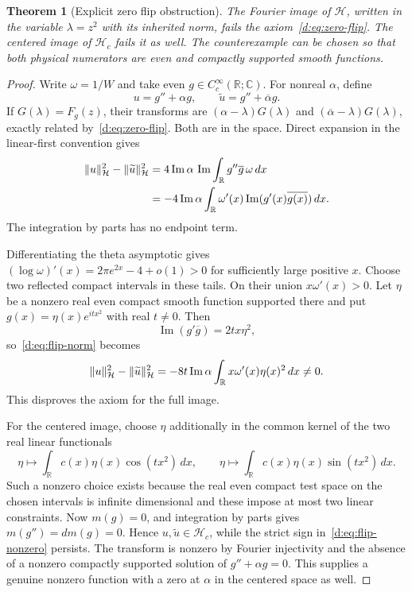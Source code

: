 \documentclass[11pt,a4paper]{article}
\numberwithin{equation}{section}
\newtheorem{theorem}{Theorem}[section]
\theoremstyle{definition}\newtheorem{definition}[theorem]{Definition}
\theoremstyle{remark}\newtheorem{remark}[theorem]{Remark}
\newcommand{\R}{\mathbb R}\newcommand{\C}{\mathbb C}\newcommand{\N}{\mathbb N}
\newcommand{\Hh}{\mathcal H}\newcommand{\Hw}{\mathcal H}
\begin{document}
\begin{theorem}[Explicit zero flip obstruction]\label{d:thm:debranges}
The Fourier image of $\Hh$, written in the variable $\lambda=z^2$ with its inherited norm, fails the axiom~\eqref{d:eq:zero-flip}. The centered image of $\Hh_c$ fails it as well. The counterexample can be chosen so that both physical numerators are even and compactly supported smooth functions.
\end{theorem}
\begin{proof}
Write $\omega=1/W$ and take even $g\in C_c^\infty(\R;\C)$. For nonreal $\alpha$, define
\[
 u=g''+\alpha g,\qquad \widetilde u=g''+\overline\alpha g.
\]
If $G(\lambda)=F_g(z)$, their transforms are $(\alpha-\lambda)G(\lambda)$ and $(\overline\alpha-\lambda)G(\lambda)$, exactly related by~\eqref{d:eq:zero-flip}. Both are in the space. Direct expansion in the linear-first convention gives
\begin{align}
 \norm{u}_{\Hh}^2-\norm{\widetilde u}_{\Hh}^2
 &=4\operatorname{Im}\alpha\,\operatorname{Im}\int_\R g''\overline g\,\omega\,dx\notag\\
 &=-4\operatorname{Im}\alpha\int_\R\omega'(x)
           \operatorname{Im}(g'(x)\overline{g(x)})\,dx.
 \label{d:eq:flip-norm}
\end{align}
The integration by parts has no endpoint term.

Differentiating the theta asymptotic gives
$(\log\omega)'(x)=2\pi e^{2x}-4+o(1)>0$ for sufficiently large positive $x$. Choose two reflected compact intervals in these tails. On their union $x\omega'(x)>0$. Let $\eta$ be a nonzero real even compact smooth function supported there and put $g(x)=\eta(x)e^{itx^2}$ with real $t\ne0$. Then
\[
 \operatorname{Im}(g'\overline g)=2tx\eta^2,
\]
so~\eqref{d:eq:flip-norm} becomes
\begin{equation}\label{d:eq:flip-nonzero}
 \norm{u}_{\Hh}^2-\norm{\widetilde u}_{\Hh}^2
 =-8t\operatorname{Im}\alpha\int_\R x\omega'(x)\eta(x)^2\,dx\ne0.
\end{equation}
This disproves the axiom for the full image.

For the centered image, choose $\eta$ additionally in the common kernel of the two real linear functionals
\[
 \eta\longmapsto\int_\R c(x)\eta(x)\cos(tx^2)\,dx,
 \qquad
 \eta\longmapsto\int_\R c(x)\eta(x)\sin(tx^2)\,dx.
\]
Such a nonzero choice exists because the real even compact test space on the chosen intervals is infinite dimensional and these impose at most two linear constraints. Now $m(g)=0$, and integration by parts gives $m(g'')=dm(g)=0$. Hence $u,\widetilde u\in\Hh_c$, while the strict sign in~\eqref{d:eq:flip-nonzero} persists. The transform is nonzero by Fourier injectivity and the absence of a nonzero compactly supported solution of $g''+\alpha g=0$. This supplies a genuine nonzero function with a zero at $\alpha$ in the centered space as well.
\end{proof}
\end{document}
